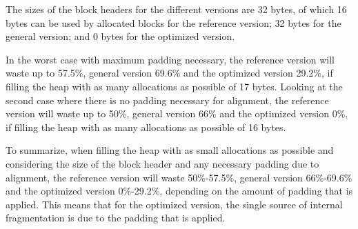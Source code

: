 The sizes of the block headers for the different versions are 32 bytes, of which 16 bytes can be used by allocated blocks for the reference version; 32 bytes for the general version; and 0 bytes for the optimized version. 

In the worst case with maximum padding necessary, the reference version will waste up to 57.5\%, general version 69.6\% and the optimized version 29.2\%, if filling the heap with as many allocations as possible of 17 bytes. Looking at the second case where there is no padding necessary for alignment, the reference version will waste up to 50\%, general version 66\% and the optimized version 0\%, if filling the heap with as many allocations as possible of 16 bytes.

To summarize, when filling the heap with as small allocations as possible and considering the size of the block header and any necessary padding due to alignment, the reference version will waste 50\%-57.5\%, general version 66\%-69.6\% and the optimized version 0\%-29.2\%, depending on the amount of padding that is applied. This means that for the optimized version, the single source of internal fragmentation is due to the padding that is applied.

